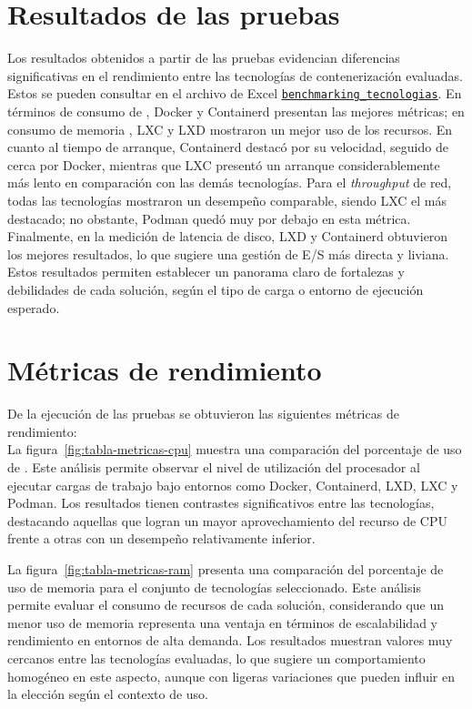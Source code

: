 \section{Resultados de las pruebas}\label{sec:resultados-pruebas}
\noindent
Los resultados obtenidos a partir de las pruebas evidencian diferencias significativas en el rendimiento entre las tecnologías de contenerización evaluadas. Estos se pueden consultar en el archivo de Excel \underline{\href{https://docs.google.com/spreadsheets/d/1Ce37Sm3Swyfa88Ur1yQbLarq_D86obUIAGGJocgQbUE/edit?usp=sharing} {\texttt{benchmarking\_tecnologias}}}.
En términos de consumo de \CPU, Docker y Containerd presentan las mejores métricas; en consumo de memoria \RAM, LXC y LXD mostraron un mejor uso de los recursos. En cuanto al tiempo de arranque, Containerd destacó por su velocidad, seguido de cerca por Docker, mientras que LXC presentó un arranque considerablemente más lento en comparación con las demás tecnologías.
Para el \textit{throughput} de red, todas las tecnologías mostraron un desempeño comparable, siendo LXC el más destacado; no obstante, Podman quedó muy por debajo en esta métrica. Finalmente, en la medición de latencia de disco, LXD y Containerd obtuvieron los mejores resultados, lo que sugiere una gestión de E/S más directa y liviana.
Estos resultados permiten establecer un panorama claro de fortalezas y debilidades de cada solución, según el tipo de carga o entorno de ejecución esperado.

\section{Métricas de rendimiento}
\noindent
De la ejecución de las pruebas se obtuvieron las siguientes métricas de rendimiento: \\

\noindent
La figura~\ref{fig:tabla-metricas-cpu} muestra una comparación del porcentaje de uso de \CPU. Este análisis permite observar el nivel de utilización del procesador al ejecutar cargas de trabajo bajo entornos como Docker, Containerd, LXD, LXC y Podman. Los resultados tienen contrastes significativos entre las tecnologías, destacando aquellas que logran un mayor aprovechamiento del recurso de CPU frente a otras con un desempeño relativamente inferior.


\noindent
La figura~\ref{fig:tabla-metricas-ram} presenta una comparación del porcentaje de uso de memoria \RAM para el conjunto de tecnologías seleccionado. Este análisis permite evaluar el consumo de recursos de cada solución, considerando que un menor uso de memoria representa una ventaja en términos de escalabilidad y rendimiento en entornos de alta demanda. Los resultados muestran valores muy cercanos entre las tecnologías evaluadas, lo que sugiere un comportamiento homogéneo en este aspecto, aunque con ligeras variaciones que pueden influir en la elección según el contexto de uso.


